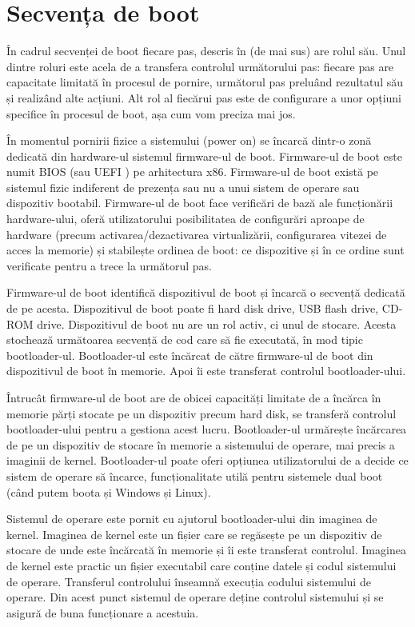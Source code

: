 \section{Secvența de boot}
\label{sec:boot-seq}

În cadrul secvenței de boot fiecare pas, descris în
 (de mai sus) are rolul său. Unul dintre
roluri este acela de a transfera controlul următorului pas: fiecare pas are
capacitate limitată în procesul de pornire, următorul pas preluând rezultatul
său și realizând alte acțiuni. Alt rol al fiecărui pas este de configurare a
unor opțiuni specifice în procesul de boot, așa cum vom preciza mai jos.

În momentul pornirii fizice a sistemului (power on) se încarcă dintr-o zonă
dedicată din hardware-ul sistemul firmware-ul de boot. Firmware-ul de boot este
numit BIOS (sau UEFI ) pe
arhitectura x86. Firmware-ul de boot există pe sistemul fizic indiferent de
prezența sau nu a unui sistem de operare sau dispozitiv bootabil. Firmware-ul de
boot face verificări de bază ale funcționării hardware-ului, oferă
utilizatorului posibilitatea de configurări aproape de hardware (precum
activarea/dezactivarea virtualizării, configurarea vitezei de acces la memorie)
și stabilește ordinea de boot: ce dispozitive și în ce ordine sunt verificate
pentru a trece la următorul pas.

Firmware-ul de boot identifică dispozitivul de boot și încarcă o secvență
dedicată de pe acesta. Dispozitivul de boot poate fi hard disk drive, USB flash
drive, CD-ROM drive. Dispozitivul de boot nu are un rol activ, ci unul de
stocare. Acesta stochează următoarea secvență de cod care să fie executată, în
mod tipic bootloader-ul. Bootloader-ul este încărcat de către firmware-ul de
boot din dispozitivul de boot în memorie. Apoi îi este transferat controlul
bootloader-ului.

Întrucât firmware-ul de boot are de obicei capacități limitate de a încărca în
memorie părți stocate pe un dispozitiv precum hard disk, se transferă controlul
bootloader-ului pentru a gestiona acest lucru. Bootloader-ul urmărește
încărcarea de pe un dispozitiv de stocare în memorie a sistemului de operare,
mai precis a imaginii de kernel. Bootloader-ul poate oferi opțiunea
utilizatorului de a decide ce sistem de operare să încarce, funcționalitate
utilă pentru sistemele dual boot (când putem boota și Windows și Linux).

Sistemul de operare este pornit cu ajutorul bootloader-ului din imaginea de
kernel. Imaginea de kernel este un fișier care se regăsește pe un dispozitiv de
stocare de unde este încărcată în memorie și îi este transferat controlul.
Imaginea de kernel este practic un fișier executabil care conține datele și
codul sistemului de operare. Transferul controlului înseamnă execuția codului
sistemului de operare. Din acest punct sistemul de operare deține controlul
sistemului și se asigură de buna funcționare a acestuia.

